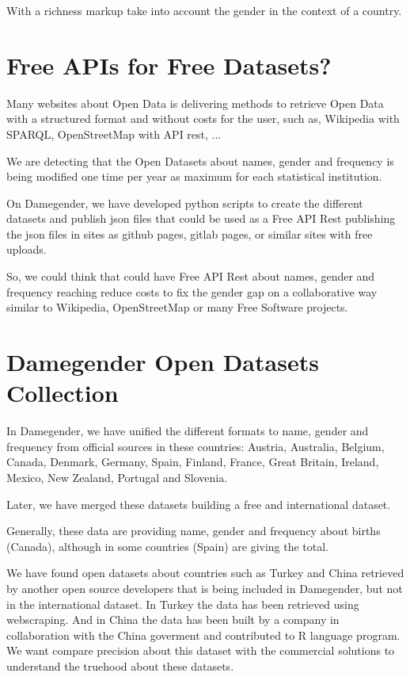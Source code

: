 \documentclass[a4paper]{article}
\begin{document}
With a richness markup take into account the gender in the context of
a country.

\section{Free APIs for Free Datasets?}
\label{sec:freeapis}

Many websites about Open Data is delivering methods to retrieve Open
Data with a structured format and without costs for the user, such as,
Wikipedia with SPARQL, OpenStreetMap with API rest, ...

We are detecting that the Open Datasets about names, gender and
frequency is being modified one time per year as maximum for each
statistical institution.

On Damegender, we have developed python scripts to create the
different datasets and publish json files that could be used as a Free
API Rest publishing the json files in sites as github pages, gitlab
pages, or similar sites with free uploads.

So, we could think that could have Free API Rest about names, gender
and frequency reaching reduce costs to fix the gender gap on a
collaborative way similar to Wikipedia, OpenStreetMap or many Free
Software projects.

\section{Damegender Open Datasets Collection}
\label{sec:damegender}

In Damegender, we have unified the different formats to name, gender
and frequency from official sources in these countries: Austria,
Australia, Belgium, Canada, Denmark, Germany, Spain, Finland, France,
Great Britain, Ireland, Mexico, New Zealand, Portugal and Slovenia.

Later, we have merged these datasets building a free and international
dataset.

Generally, these data are providing name, gender and frequency about
births (Canada), although in some countries (Spain) are giving the
total.

We have found open datasets about countries such as Turkey and China
retrieved by another open source developers that is being included in
Damegender, but not in the international dataset. In Turkey the data
has been retrieved using webscraping. And in China the data has been
built by a company in collaboration with the China goverment and
contributed to R language program. We want compare precision about
this dataset with the commercial solutions to understand the truehood
about these datasets.
\end{document}
